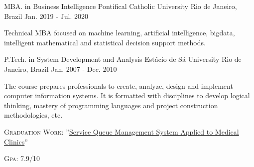

\begin{cventries}

  \cventry
    {MBA. in Business Intelligence} %
    {Pontifical Catholic University} %
    {Rio de Janeiro, Brazil} %
    {Jan. 2019 - Jul. 2020} %
    {
      \begin{cvitems} %
        \item {Technical MBA focused on machine learning, artificial intelligence, bigdata, intelligent mathematical and statistical decision support methods.}
      \end{cvitems}
    }

  \cventry
    {P.Tech. in System Development and Analysis} %
    {Estácio de Sá University} %
    {Rio de Janeiro, Brazil} %
    {Jan. 2007 - Dec. 2010} %
    {
      \begin{cvitems} %
        \item {The course prepares professionals to create, analyze, design and implement computer information systems. It is formatted with disciplines to develop logical thinking, mastery of programming languages and project construction methodologies, etc.}
        \item {\textsc{Graduation Work}: ''\href{https://github.com/jfalves/camimsca}{Service Queue Management System Applied to Medical Clinics}''}
        \item {\textsc{Gpa}: 7.9/10}
      \end{cvitems}
    }

\end{cventries}
